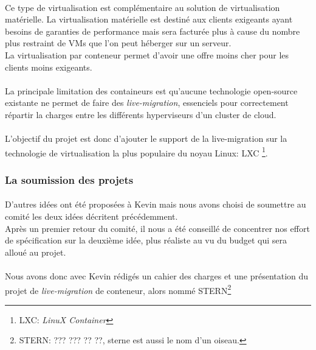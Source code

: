 \paragraph*{}
Ce type de virtualisation est complémentaire au solution de virtualisation matérielle. La virtualisation matérielle est destiné aux clients exigeants ayant besoins de garanties
de performance mais sera facturée plus à cause du nombre plus restraint de VMs que l'on peut héberger sur un serveur.
\\
La virtualisation par conteneur permet d'avoir une offre moins cher pour les clients moins exigeants.

\paragraph*{}
La principale limitation des containeurs est qu'aucune technologie open-source existante ne permet de faire des \emph{live-migration}, essenciels pour correctement répartir
la charges entre les différents hyperviseurs d'un cluster de cloud.

\paragraph*{}
L'objectif du projet est donc d'ajouter le support de la live-migration sur la technologie de virtualisation la plus populaire du noyau Linux: LXC
\footnote{LXC: \emph{LinuX Container}}.


\subsubsection{La soumission des projets}
\paragraph*{}
D'autres idées ont été proposées à Kevin mais nous avons choisi de soumettre au comité les deux idées décritent précédemment.
\\
Après un premier retour du comité, il nous a été conseillé de concentrer nos effort de spécification sur la deuxième idée, plus réaliste au vu du budget qui sera alloué au projet.

\paragraph*{}
Nous avons donc avec Kevin rédigés un cahier des charges et une présentation du projet de \emph{live-migration} de conteneur, alors nommé STERN\footnote{STERN: ??? ??? ?? ??, sterne est aussi le nom
d'un oiseau.}

